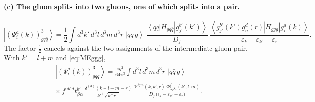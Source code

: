 \documentclass[11pt,a4paper]{article}
\numberwithin{equation}{section}
\newcommand{\eps}{\varepsilon}
\newcommand{\dthree}{\delta^{(3)}}
\newcommand{\ket}[1]{\left|#1\right\rangle}
\newcommand{\bra}[1]{\left\langle#1\right|}
\newcommand{\Ph}{\Phi}
\newcommand{\Vg}{\mathcal{V}}
\newcommand{\qk}[3]{q^{#1}_{#2}(#3)}
\newcommand{\aqk}[3]{\bar q^{#1}_{#2}(#3)}
\newcommand{\gl}[3]{g^{#1}_{#2}(#3)}
\begin{document}
\paragraph{(c) The gluon splits into two gluons, one of which splits into a pair.}
\begin{center}
\end{center}
\begin{equation}
\ket{(\Psi^{a}_{i}(k))^{3}_{gq\bar q}}=\frac12\int\! d^{3}k'\,d^{3}l\,d^{3}m\,d^{3}r\;
\ket{q\bar q\,g}\;
\frac{\bra{q\bar q}H_{gq\bar q}\ket{\gl{b'}{j'}{k'}}}{D_{f}}\;
\frac{\bra{\gl{b'}{j'}{k'}\gl{d}{n}{r}}H_{ggg}\ket{\gl{a}{i}{k}}}{\eps_{k}-\eps_{k'}-\eps_{r}} .
\end{equation}
The factor $\tfrac12$ cancels against the two assignments of the intermediate gluon pair. With
$k'=l+m$ and \eqref{eq:MEggg},
\begin{multline}
\ket{(\Psi^{a}_{i}(k))^{3}_{gq\bar q}}=\frac{ig^{2}}{64\pi^{3}}\int\! d^{3}l\,d^{3}m\,d^{3}r\;
\ket{q\bar q\,g}\\
\times\,f^{ab'd}t^{b'}_{\beta\alpha}\,\frac{\dthree(k-l-m-r)}{k'^{+}\sqrt{k^{+}r^{+}}}\,
\frac{\Vg^{ij'n}(k;k',r)\;\Ph^{j'}_{\lambda_{1}\lambda_{2}}(k';l,m)}
{D_{f}\,\big(\eps_{k}-\eps_{k'}-\eps_{r}\big)} .
\label{eq:B3c}
\end{multline}
\end{document}
